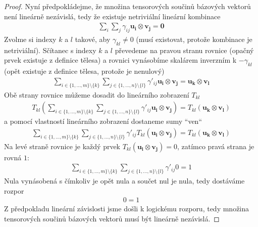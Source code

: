 \documentclass[a5paper,12pt]{amsbook}
\theoremstyle{definition}
\newcommand{\myvec}[1]{\bm{#1}}
\begin{document}
\begin{proof}
Nyní předpokládejme, že množina tensorových součinů bázových vektorů není lineárně nezávislá,
tedy že existuje netriviální lineární kombinace
\begin{equation*}
\begin{split}
\sum_{i}\sum_{j}\gamma_{ij}\myvec{u_i}\otimes\myvec{v_j} = \myvec{0}
\end{split}
\end{equation*}
Zvolme si indexy $k$ a $l$ takové, aby $\gamma_{kl} \neq 0$ (musí existovat, protože kombinace
je netriviální). Sčítanec s indexy $k$ a $l$ převedeme na pravou stranu rovnice (opačný prvek
existuje z definice tělesa) a rovnici vynásobíme skalárem inverzním k $-\gamma_{kl}$ (opět
existuje z definice tělesa, protože je nenulový)
\begin{equation*}
\begin{split}
\sum_{i\in\{1, \dots, m\}\setminus\{k\}}
  \sum_{j\in\{1, \dots, n\}\setminus\{l\}}\gamma'_{ij}\myvec{u_i}\otimes\myvec{v_j} 
  = \myvec{u_k}\otimes\myvec{v_l}
\end{split}
\end{equation*}
Obě strany rovnice můžeme dosadit do lineárního zobrazení $T_{kl}$
\begin{equation*}
\begin{split}
T_{kl}(\sum_{i\in\{1, \dots, m\}\setminus\{k\}}
  \sum_{j\in\{1, \dots, n\}\setminus\{l\}}\gamma'_{ij}\myvec{u_i}\otimes\myvec{v_j})
  = T_{kl}(\myvec{u_k}\otimes\myvec{v_l})
\end{split}
\end{equation*}
a pomocí vlastností lineárního zobrazení dostaneme sumy ``ven``
\begin{equation*}
\begin{split}
\sum_{i\in\{1, \dots, m\}\setminus\{k\}}
  \sum_{j\in\{1, \dots, n\}\setminus\{l\}}\gamma'_{ij}T_{kl}(\myvec{u_i}\otimes\myvec{v_j})
  = T_{kl}(\myvec{u_k}\otimes\myvec{v_l})
\end{split}
\end{equation*}
Na levé straně rovnice je každý prvek $T_{kl}(\myvec{u_i}\otimes\myvec{v_j}) = 0$, zatímco
pravá strana je rovná $1$:
\begin{equation*}
\begin{split}
\sum_{i\in\{1, \dots, m\}\setminus\{k\}}
  \sum_{j\in\{1, \dots, n\}\setminus\{l\}}\gamma'_{ij}0 = 1
\end{split}
\end{equation*}
Nula vynásobená s čímkoliv je opět nula a součet nul je nula, tedy dostáváme rozpor
\begin{equation*}
\begin{split}
0 = 1
\end{split}
\end{equation*}
Z předpokladu lineární závislosti jsme došli k logickému rozporu, tedy množina tensorových součinů
bázových vektorů musí být lineárně nezávislá.
\end{proof}
\end{document}
